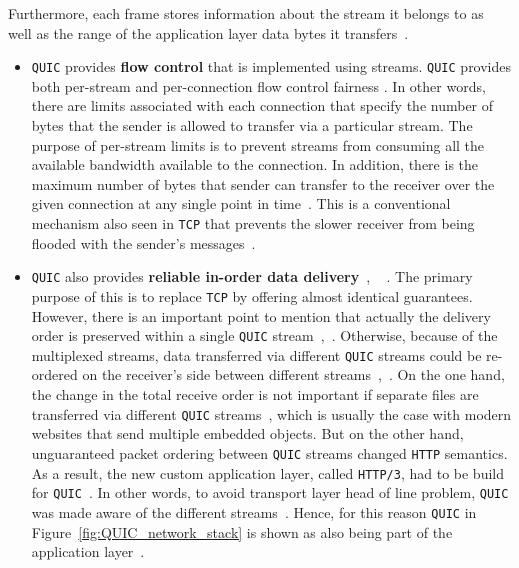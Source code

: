 \documentclass[12pt,a4paper,twoside,openright]{report}
\begin{document}
  Furthermore, each frame stores information about the stream it belongs to as well as the range of the application layer data bytes it transfers~\cite{UnderstandQUIC}.
  \begin{itemize}
  
  
  \item \texttt{QUIC} provides \textbf{flow control} that is implemented using streams.
  \texttt{QUIC} provides both per-stream and per-connection flow control fairness \cite{ietf-quic-transport-draft-32}.
  In other words, there are limits associated with each connection that specify the number of bytes that the sender is allowed to transfer via a particular stream.
  The purpose of per-stream limits is to prevent streams from consuming all the available bandwidth available to the connection.
  In addition, there is the maximum number of bytes that sender can transfer to the receiver over the given connection at any single point in time~\cite{ietf-quic-transport-draft-32}.
  This is a conventional mechanism also seen in \texttt{TCP} that prevents the slower receiver from being flooded with the sender's messages~\cite{ietf-quic-transport-draft-32}.
  
  
    \item \texttt{QUIC} also provides \textbf{reliable in-order data delivery}~\cite[Section 7]{ietf-quic-transport-draft-32}, ~\cite{head-of-line-blocking-in-quic-and-http-3-the-details} .
    The primary purpose of this is to replace \texttt{TCP} by offering almost identical guarantees. 
    However, there is an important point to mention that actually the delivery order is preserved within a single \texttt{QUIC} stream~\cite{head-of-line-blocking-in-quic-and-http-3-the-details},~\cite[Section 2]{ietf-quic-transport-draft-32}.
    Otherwise, because of the multiplexed streams, data transferred via different \texttt{QUIC} streams could be re-ordered on the receiver's side between different streams~\cite{head-of-line-blocking-in-quic-and-http-3-the-details},~\cite[Section 2]{ietf-quic-transport-draft-32}.
    On the one hand, the change in the total receive order is not important if separate files are transferred via different \texttt{QUIC} streams~\cite{head-of-line-blocking-in-quic-and-http-3-the-details}, which is usually the case with modern websites that send multiple embedded objects.
    But on the other hand, unguaranteed packet ordering between \texttt{QUIC} streams changed \texttt{HTTP} semantics.
    As a result, the new custom application layer, called \texttt{HTTP/3}, had to be build for \texttt{QUIC}~\cite{head-of-line-blocking-in-quic-and-http-3-the-details}.
    In other words, to avoid transport layer head of line problem, \texttt{QUIC} was made aware of the different streams~\cite{head-of-line-blocking-in-quic-and-http-3-the-details}.
    Hence, for this reason \texttt{QUIC} in Figure~\ref{fig:QUIC_network_stack} is shown as also being part of the application layer~\cite{head-of-line-blocking-in-quic-and-http-3-the-details}.
    

\end{itemize}
\end{document}
